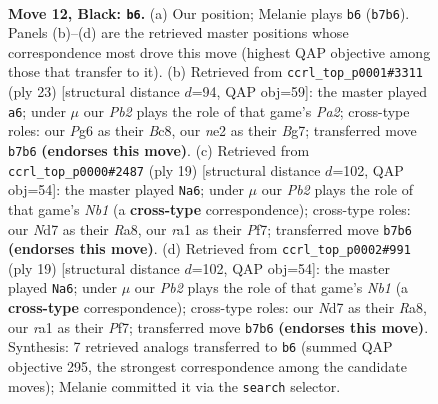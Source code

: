 \documentclass[11pt]{article}
\begin{document}
\clearpage

\begin{figure}[p]\centering
\begin{subfigure}{0.46\textwidth}\centering
\resizebox{\linewidth}{!}{%
\newchessgame
\chessboard[
  setfen={rn1qr1k1/pp1n1pbp/3p2p1/2pP4/P3PP1P/2N5/1P2N1P1/R1BQK2R b KQ - 1 12},
  showmover=false,
  pgfstyle=straightmove, color=movearrow, markmove={b7-b6}
]}
\caption{}
\end{subfigure}\hfill
\begin{subfigure}{0.46\textwidth}\centering
\resizebox{\linewidth}{!}{%
\newchessgame
\chessboard[
  setfen={rnbqr1k1/pp3pb1/3p1np1/2pP3p/P3P3/2N1BP2/1P1QB1PP/R3K1NR b KQ - 0 12},
  showmover=false,
  pgfstyle=straightmove, color=movearrow, markmove={a7-a6}
]}
\caption{}
\end{subfigure}
\\[4pt]
\begin{subfigure}{0.46\textwidth}\centering
\resizebox{\linewidth}{!}{%
\newchessgame
\chessboard[
  setfen={rnbqr1k1/pp3pbp/3p1np1/2pP4/4P3/2N4P/PP1NBPP1/R1BQK2R b KQ - 6 10},
  showmover=false,
  pgfstyle=straightmove, color=movearrow, markmove={b8-a6}
]}
\caption{}
\end{subfigure}\hfill
\begin{subfigure}{0.46\textwidth}\centering
\resizebox{\linewidth}{!}{%
\newchessgame
\chessboard[
  setfen={rnbqr1k1/pp3pbp/3p1np1/2pP4/4P3/2N4P/PP1NBPP1/R1BQK2R b KQ - 6 10},
  showmover=false,
  pgfstyle=straightmove, color=movearrow, markmove={b8-a6}
]}
\caption{}
\end{subfigure}
\caption{\textbf{Move 12, Black: \texttt{b6}.} (a) Our position; Melanie plays \texttt{b6} (\texttt{b7b6}). Panels (b)--(d) are the retrieved master positions whose correspondence most drove this move (highest QAP objective among those that transfer to it). (b) Retrieved from \texttt{ccrl\_top\_p0001\#3311} (ply 23) [structural distance $d$=94, QAP obj=59]: the master played \texttt{a6}; under $\mu$ our \emph{Pb2} plays the role of that game's \emph{Pa2}; cross-type roles: our \emph{P}g6 as their \emph{B}c8, our \emph{n}e2 as their \emph{B}g7; transferred move \texttt{b7b6} \textbf{(endorses this move)}. (c) Retrieved from \texttt{ccrl\_top\_p0000\#2487} (ply 19) [structural distance $d$=102, QAP obj=54]: the master played \texttt{Na6}; under $\mu$ our \emph{Pb2} plays the role of that game's \emph{Nb1} (a \textbf{cross-type} correspondence); cross-type roles: our \emph{N}d7 as their \emph{R}a8, our \emph{r}a1 as their \emph{P}f7; transferred move \texttt{b7b6} \textbf{(endorses this move)}. (d) Retrieved from \texttt{ccrl\_top\_p0002\#991} (ply 19) [structural distance $d$=102, QAP obj=54]: the master played \texttt{Na6}; under $\mu$ our \emph{Pb2} plays the role of that game's \emph{Nb1} (a \textbf{cross-type} correspondence); cross-type roles: our \emph{N}d7 as their \emph{R}a8, our \emph{r}a1 as their \emph{P}f7; transferred move \texttt{b7b6} \textbf{(endorses this move)}. Synthesis: 7 retrieved analogs transferred to \texttt{b6} (summed QAP objective 295, the strongest correspondence among the candidate moves); Melanie committed it via the \texttt{search} selector.}
\label{fig:thought-m23}
\end{figure}
\end{document}
